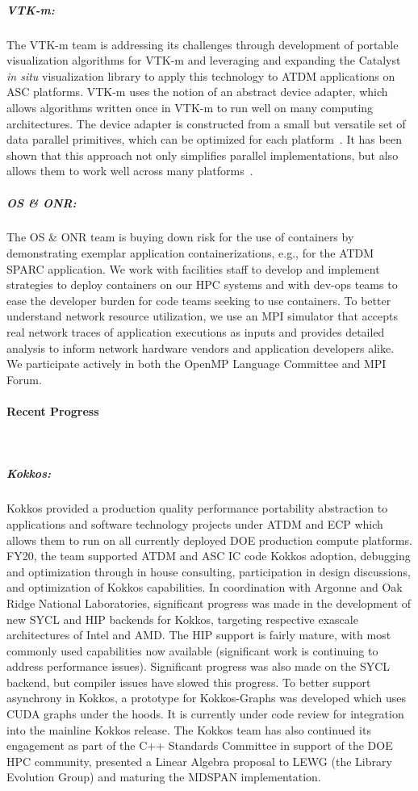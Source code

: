 \subparagraph{VTK-m:} The VTK-m team is addressing its challenges through
development of portable visualization algorithms for VTK-m and leveraging and
expanding the Catalyst~\cite{Catalyst}  \emph{in situ} visualization library to
apply this technology to ATDM applications on ASC platforms.  VTK-m uses the
notion of an abstract device adapter, which allows algorithms written once in
VTK-m to run well on many computing architectures.  The device adapter is
constructed from a small but versatile set of data parallel primitives, which
can be optimized for each platform~\cite{Blelloch1990}.  It has been shown that
this approach not only simplifies parallel implementations, but also allows
them to work well across many platforms~\cite{Lo2012,Larsen2015,Moreland2015}.

\subparagraph{OS \& ONR:} The OS \& ONR team is buying down risk for the use of containers by demonstrating exemplar application containerizations, e.g., for the ATDM SPARC application.  We work with facilities staff to develop and implement strategies to deploy containers on our HPC systems and with dev-ops teams to ease the developer burden for code teams seeking to use containers.  To better understand network resource utilization, we use an MPI simulator that accepts real network traces of application executions as inputs and provides detailed analysis to inform network hardware vendors and application developers alike.  We participate actively in both the OpenMP Language Committee and MPI Forum.



\paragraph{Recent Progress} \leavevmode \\


\subparagraph{Kokkos:}  Kokkos provided a production quality performance portability abstraction to applications and software technology projects under ATDM and ECP which allows them to run on all currently deployed DOE production compute platforms. FY20, the team supported ATDM and ASC IC code Kokkos adoption, debugging and optimization through in house consulting, participation in design discussions, and optimization of Kokkos capabilities.  In coordination with Argonne and Oak Ridge National Laboratories, significant progress was made in the development of new SYCL and HIP backends for Kokkos, targeting respective exascale architectures of Intel and AMD.  The HIP support is fairly mature, with most commonly used capabilities now available (significant work is continuing to address performance issues).  Significant progress was also made on the SYCL backend, but compiler issues have slowed this progress.  To better support asynchrony in Kokkos, a prototype for Kokkos-Graphs was developed which uses CUDA graphs under the hoods. It is currently under code review for integration into the mainline Kokkos release.  The Kokkos team has also continued its engagement as part of the C++ Standards Committee in support of the DOE HPC community, presented a Linear Algebra proposal to LEWG (the Library Evolution Group) and maturing the MDSPAN implementation. 


